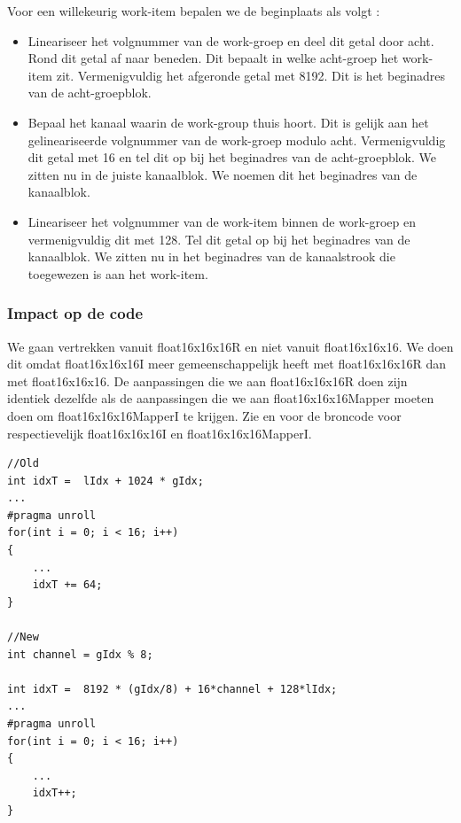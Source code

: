 Voor een willekeurig work-item bepalen we de beginplaats als volgt :
\begin{itemize}
    \item Lineariseer het volgnummer van de work-groep en deel dit getal door acht. Rond dit getal af naar beneden. Dit bepaalt in welke acht-groep het work-item zit. Vermenigvuldig het afgeronde getal met 8192. Dit is het beginadres van de acht-groepblok.
    \item Bepaal het kanaal waarin de work-group thuis hoort. Dit is gelijk aan het gelineariseerde volgnummer van de work-groep modulo acht. Vermenigvuldig dit getal met 16 en tel dit op bij het beginadres van de acht-groepblok. We zitten nu in de juiste kanaalblok. We noemen dit het beginadres van de kanaalblok.
    \item Lineariseer het volgnummer van de work-item binnen de work-groep en vermenigvuldig dit met 128. Tel dit getal op bij het beginadres van de kanaalblok. We zitten nu in het beginadres van de kanaalstrook die toegewezen is aan het work-item.
\end{itemize}

\subsubsection{Impact op de code}
We gaan vertrekken vanuit float16x16x16R en niet vanuit float16x16x16. We doen dit omdat  float16x16x16I meer gemeenschappelijk heeft met  float16x16x16R dan met float16x16x16. De aanpassingen die we aan float16x16x16R doen zijn identiek dezelfde als de aanpassingen die we aan float16x16x16Mapper moeten doen om float16x16x16MapperI te krijgen. Zie  en  voor de broncode voor respectievelijk float16x16x16I en float16x16x16MapperI.

\begin{lstlisting}
//Old
int idxT =  lIdx + 1024 * gIdx;
...
#pragma unroll
for(int i = 0; i < 16; i++)
{
	...
	idxT += 64;
}

//New
int channel = gIdx % 8;

int idxT =  8192 * (gIdx/8) + 16*channel + 128*lIdx; 
...
#pragma unroll
for(int i = 0; i < 16; i++)
{
	...
	idxT++;
}
\end{lstlisting}
